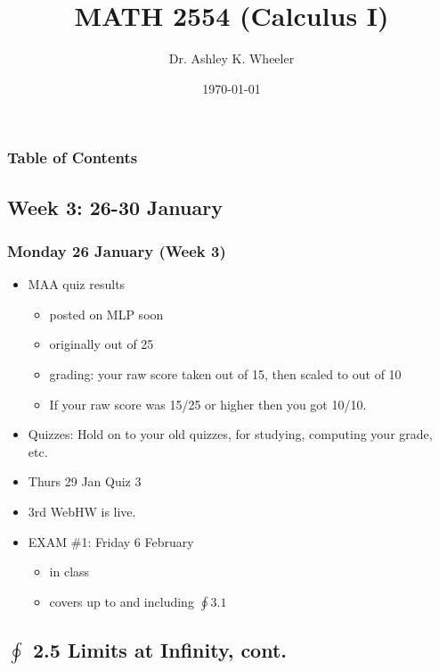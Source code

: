 \documentclass[14pt]{beamer}
\title[Cal I S2015]{MATH 2554 (Calculus I)}
\subtitle{}
\author[Wheeler]{Dr. Ashley K. Wheeler}
\institute{University of Arkansas}
\date{\today}
\begin{document}
\maketitle

\begin{frame}
\frametitle{Table of Contents}
\tableofcontents
\end{frame}


\begin{frame}
\section[Week 3]{Week 3: 26-30 January}
\frametitle{Monday 26 January (Week 3)}
\footnotesize
\begin{itemize}
\item MAA quiz results 
	\begin{itemize}
	\footnotesize
	\item posted on MLP soon
	\item originally out of 25 
	\item grading: your raw score taken out of 15, then scaled to out of 10
	\item If your raw score was 15/25 or higher then you got 10/10. 
	\end{itemize}
\item Quizzes: Hold on to your old quizzes, for studying, computing your grade, etc.
\item Thurs 29 Jan Quiz 3 
\item 3rd WebHW is live.
\item EXAM \#1: Friday 6 February 
	\begin{itemize}
	\footnotesize
	\item in class
	\item covers up to and including $\oint 3.1$
	\end{itemize}
\end{itemize}
\end{frame}

\subsection[2.5 Limits at Infinity, cont.]{$\oint$ 2.5 Limits at Infinity, cont.}
\end{document}

